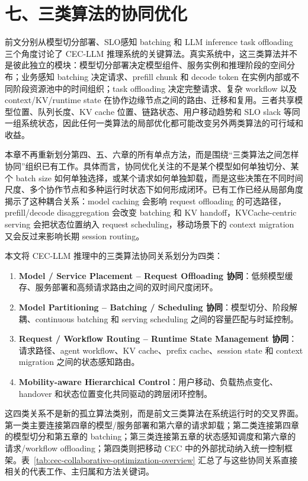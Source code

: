 \section*{七、三类算法的协同优化}

前文分别从模型切分部署、SLO感知 batching 和 LLM inference task offloading 三个角度讨论了 CEC-LLM 推理系统的关键算法。真实系统中，这三类算法并不是彼此独立的模块：模型切分部署决定模型组件、服务实例和推理阶段的空间分布；业务感知 batching 决定请求、prefill chunk 和 decode token 在实例内部或不同阶段资源池中的时间组织；task offloading 决定完整请求、复杂 workflow 以及 context/KV/runtime state 在协作边缘节点之间的路由、迁移和复用。三者共享模型位置、队列长度、KV cache 位置、链路状态、用户移动趋势和 SLO slack 等同一组系统状态，因此任何一类算法的局部优化都可能改变另外两类算法的可行域和收益。

本章不再重新划分第四、五、六章的所有单点方法，而是围绕“三类算法之间怎样协同”组织已有工作。具体而言，协同优化关注的不是某个模型如何单独切分、某个 batch size 如何单独选择，或某个请求如何单独卸载，而是这些决策在不同时间尺度、多个协作节点和多种运行时状态下如何形成闭环。已有工作已经从局部角度揭示了这种耦合关系：model caching 会影响 request offloading 的可选路径，prefill/decode disaggregation 会改变 batching 和 KV handoff，KVCache-centric serving 会把状态位置纳入 request scheduling，移动场景下的 context migration 又会反过来影响长期 session routing。

本文将 CEC-LLM 推理中的三类算法协同关系划分为四类：
\begin{enumerate}
\item \textbf{Model / Service Placement -- Request Offloading 协同}：低频模型缓存、服务部署和高频请求路由之间的双时间尺度闭环。
\item \textbf{Model Partitioning -- Batching / Scheduling 协同}：模型切分、阶段解耦、continuous batching 和 serving scheduling 之间的容量匹配与时延控制。
\item \textbf{Request / Workflow Routing -- Runtime State Management 协同}：请求路径、agent workflow、KV cache、prefix cache、session state 和 context migration 之间的状态感知路由。
\item \textbf{Mobility-aware Hierarchical Control}：用户移动、负载热点变化、handover 和状态位置变化共同驱动的跨层闭环控制。
\end{enumerate}

这四类关系不是新的孤立算法类别，而是前文三类算法在系统运行时的交叉界面。第一类主要连接第四章的模型/服务部署和第六章的请求卸载；第二类连接第四章的模型切分和第五章的 batching；第三类连接第五章的状态感知调度和第六章的请求/workflow offloading；第四类则把移动 CEC 中的外部扰动纳入统一控制框架。表~\ref{tab:cec-collaborative-optimization-overview} 汇总了与这些协同关系直接相关的代表工作、主归属和方法关键词。

